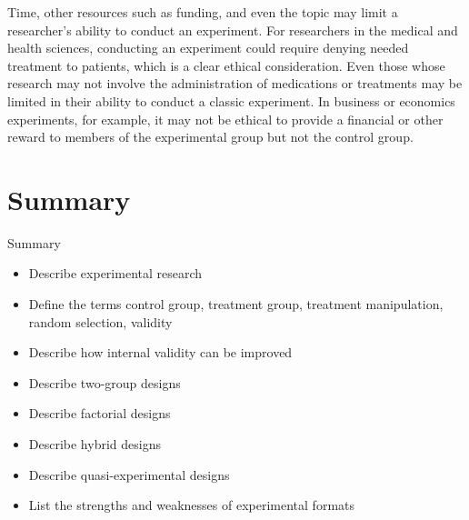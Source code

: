 Time, other resources such as funding, and even the topic may limit a researcher's ability to conduct an experiment. For researchers in the medical and health sciences, conducting an experiment could require denying needed treatment to patients, which is a clear ethical consideration. Even those whose research may not involve the administration of medications or treatments may be limited in their ability to conduct a classic experiment. In business or economics experiments, for example, it may not be ethical to provide a financial or other reward to members of the experimental group but not the control group. 

\section{Summary}\label{ch09:summary}

\begin{center}
	\begin{tkawybox}{Summary}
		\begin{itemize}
			\setlength{\itemsep}{0pt}
			\setlength{\parskip}{0pt}
			\setlength{\parsep}{0pt}
			
			\item Describe experimental research
			\item Define the terms control group, treatment group, treatment manipulation, random selection, validity
			\item Describe how internal validity can be improved
			\item Describe two-group designs
			\item Describe factorial designs
			\item Describe hybrid designs
			\item Describe quasi-experimental designs
			\item List the strengths and weaknesses of experimental formats
			
		\end{itemize}
	\end{tkawybox}
\end{center}
